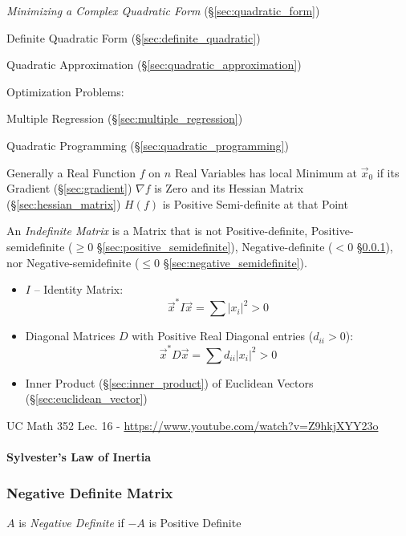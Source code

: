 \emph{Minimizing a Complex Quadratic Form} (\S\ref{sec:quadratic_form})

\fist Definite Quadratic Form (\S\ref{sec:definite_quadratic})

\fist Quadratic Approximation (\S\ref{sec:quadratic_approximation})

Optimization Problems:

\fist Multiple Regression (\S\ref{sec:multiple_regression})

\fist Quadratic Programming (\S\ref{sec:quadratic_programming})

Generally a Real Function $f$ on $n$ Real Variables has local Minimum at
$\vec{x}_0$ if its Gradient (\S\ref{sec:gradient}) $\nabla f$ is Zero and its
Hessian Matrix (\S\ref{sec:hessian_matrix}) $H(f)$ is Positive Semi-definite at
that Point

An \emph{Indefinite Matrix} is a Matrix that is not Positive-definite,
Positive-semidefinite ($\geq 0$ \S\ref{sec:positive_semidefinite}),
Negative-definite ($< 0$ \S\ref{sec:negative_definite}), nor
Negative-semidefinite ($\leq 0$ \S\ref{sec:negative_semidefinite}).

\begin{itemize}
  \item $I$ -- Identity Matrix:
    \[
      \vec{x}^*I\vec{x} = \sum |x_i|^2 > 0
    \]
  \item Diagonal Matrices $D$ with Positive Real Diagonal entries ($d_{ii} >
    0$):
    \[
      \vec{x}^*D\vec{x} = \sum d_{ii}|x_i|^2 > 0
    \]
  \item Inner Product (\S\ref{sec:inner_product}) of Euclidean Vectors
    (\S\ref{sec:euclidean_vector})
\end{itemize}


UC Math 352 Lec. 16 - \url{https://www.youtube.com/watch?v=Z9hkjXYY23o}



\paragraph{Sylvester's Law of Inertia}\label{sec:sylversters_law}\hfill



\subsubsection{Negative Definite Matrix}\label{sec:negative_definite}

$A$ is \emph{Negative Definite} if $-A$ is Positive Definite



